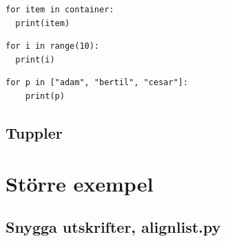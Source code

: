 \begin{frame}[fragile]
  \begin{lstlisting}[basicstyle=\huge,numbers=none]
for item in container:
  print(item)
  \end{lstlisting}
\end{frame}

\begin{frame}[fragile]
  \begin{example}
    \begin{lstlisting}
for i in range(10):
  print(i)
    \end{lstlisting}
  \end{example}
\end{frame}

\begin{frame}[fragile]
  \begin{example}
    \begin{lstlisting}
for p in ["adam", "bertil", "cesar"]:
    print(p)
    \end{lstlisting}
  \end{example}
\end{frame}

\begin{frame}[fragile]
  \begin{example}
    
  \end{example}
\end{frame}



\subsection{Tuppler}

\begin{frame}[fragile]
  \begin{example}[tuples.py]
    
  \end{example}
\end{frame}


\section{Större exempel}

\subsection{Snygga utskrifter, align\textunderscore{}list.py}


